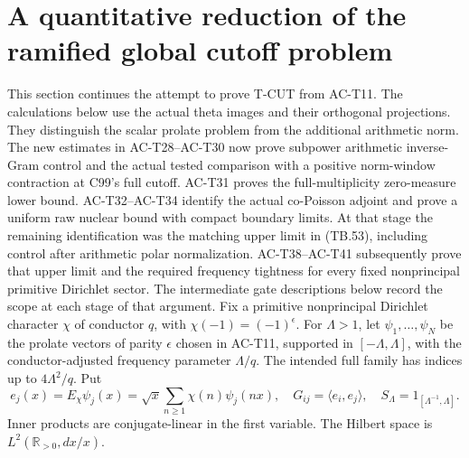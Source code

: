 \section{A quantitative reduction of the ramified global cutoff problem}
\label{sec:ACcutoffbridge}

This section continues the attempt to prove T-CUT from AC-T11.
The calculations below use the actual theta images and their
orthogonal projections.  They distinguish the scalar prolate
problem from the additional arithmetic norm.
The new estimates in AC-T28--AC-T30 now prove subpower
arithmetic inverse-Gram control and the actual tested
comparison with a positive norm-window contraction at
C99's full cutoff.  AC-T31 proves the full-multiplicity
zero-measure lower bound.  AC-T32--AC-T34 identify the
actual co-Poisson adjoint and prove a uniform raw nuclear
bound with compact boundary limits.  At that stage the
remaining identification was the matching upper limit
in (TB.53), including control after arithmetic polar
normalization.  AC-T38--AC-T41 subsequently prove that
upper limit and the required frequency tightness for
every fixed nonprincipal primitive Dirichlet sector.
The intermediate gate descriptions below record the
scope at each stage of that argument.
Fix a primitive nonprincipal Dirichlet character \(\chi\) of
conductor \(q\), with \(\chi(-1)=(-1)^\epsilon\).
For \(\Lambda>1\), let \(\psi_1,\ldots,\psi_N\) be the prolate
vectors of parity \(\epsilon\) chosen in AC-T11, supported in
\([-\Lambda,\Lambda]\), with the conductor-adjusted frequency
parameter \(\Lambda/q\).  The intended full family has indices
up to \(4\Lambda^2/q\).
Put
\[
 e_j(x)=E_\chi\psi_j(x)
   =\sqrt{x}\sum_{n\geq1}\chi(n)\psi_j(nx),\quad
 G_{ij}=\langle e_i,e_j\rangle,\quad
 S_\Lambda=1_{[\Lambda^{-1},\Lambda]}.
\]
Inner products are conjugate-linear in the first variable.
The Hilbert space is \(L^2(\mathbb R_{>0},dx/x)\).


